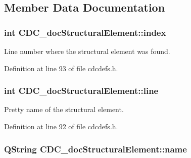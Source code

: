 \subsection{Member Data Documentation}
\hypertarget{struct_c_d_c__doc_structural_element_a009cc844acc8e5d91cc7185ea8a5aab9}{
\subsubsection[{index}]{\setlength{\rightskip}{0pt plus 5cm}int C\+D\+C\+\_\+doc\+Structural\+Element\+::index}}\label{struct_c_d_c__doc_structural_element_a009cc844acc8e5d91cc7185ea8a5aab9}


Line number where the structural element was found. 



Definition at line 93 of file cdcdefs.\+h.

\hypertarget{struct_c_d_c__doc_structural_element_a115fdf21a90b5c0bc244a8bd395f061d}{
\subsubsection[{line}]{\setlength{\rightskip}{0pt plus 5cm}int C\+D\+C\+\_\+doc\+Structural\+Element\+::line}}\label{struct_c_d_c__doc_structural_element_a115fdf21a90b5c0bc244a8bd395f061d}


Pretty name of the structural element. 



Definition at line 92 of file cdcdefs.\+h.

\hypertarget{struct_c_d_c__doc_structural_element_a03c24ec8c452b6cb8ccf7ea97f8865c8}{
\subsubsection[{name}]{\setlength{\rightskip}{0pt plus 5cm}Q\+String C\+D\+C\+\_\+doc\+Structural\+Element\+::name}}\label{struct_c_d_c__doc_structural_element_a03c24ec8c452b6cb8ccf7ea97f8865c8}


